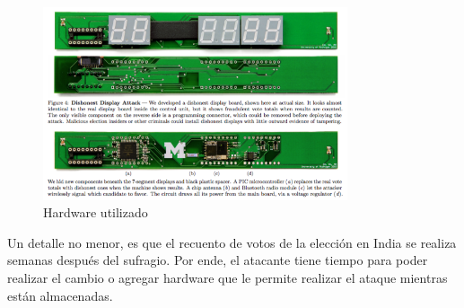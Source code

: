 \begin{figure}[h]
\includegraphics[width=0.8\textwidth]{Imagenes/almacenamiento2}
\caption{Hardware utilizado}
\end{figure}

Un detalle no menor, es que el recuento de votos de la elección en India se realiza semanas después del sufragio. Por ende, el atacante tiene tiempo para poder realizar el cambio o agregar hardware que le permite realizar el ataque mientras están almacenadas.
